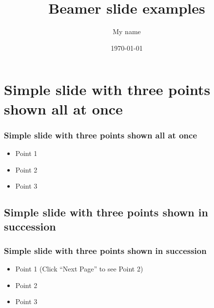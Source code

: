 \documentclass{beamer}
\title{Beamer slide examples}    %
\author{My name}                 %
\institute{My organization}      %
\date{\today}
\begin{document}
\begin{frame}
  \titlepage
\end{frame}

\section[Outline] {}

\begin{frame}
  \tableofcontents
\end{frame}


\section{Simple slide with three points shown all at once}

\begin{frame}
  \frametitle{Simple slide with three points shown all at once}   %

  \begin{itemize}
  \item Point 1
  \item Point 2
  \item Point 3
  \end{itemize}
\end{frame}

\subsection{Simple slide with three points shown in succession}

\begin{frame}
  \frametitle{Simple slide with three points shown in succession}   %

  \begin{itemize}
  \item<1-> Point 1 (Click ``Next Page'' to see Point 2) %
  \item<2-> Point 2  %
  \item<3-> Point 3
  \end{itemize}
\end{frame}
\end{document}
